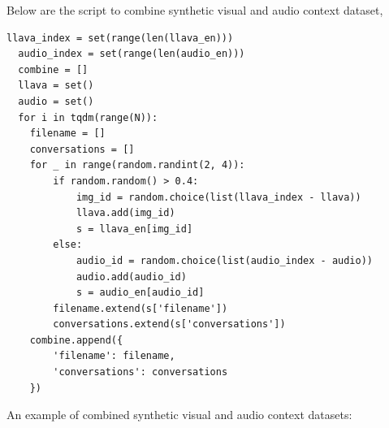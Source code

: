 \documentclass[preprint]{article}
\begin{document}
Below are the script to combine synthetic visual and audio context dataset,

\begin{lstlisting}[breaklines=true]
  llava_index = set(range(len(llava_en)))
  audio_index = set(range(len(audio_en)))
  combine = []
  llava = set()
  audio = set()
  for i in tqdm(range(N)):
    filename = []
    conversations = []
    for _ in range(random.randint(2, 4)):
        if random.random() > 0.4:
            img_id = random.choice(list(llava_index - llava))
            llava.add(img_id)
            s = llava_en[img_id]
        else:
            audio_id = random.choice(list(audio_index - audio))
            audio.add(audio_id)
            s = audio_en[audio_id]
        filename.extend(s['filename'])
        conversations.extend(s['conversations'])
    combine.append({
        'filename': filename,
        'conversations': conversations
    })
\end{lstlisting}

An example of combined synthetic visual and audio context datasets:
\end{document}
